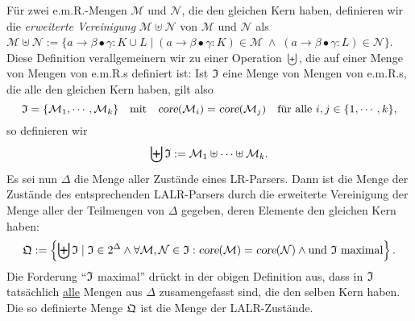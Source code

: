 F\"ur zwei e.m.R.-Mengen $\mathcal{M}$ und $\mathcal{N}$, die
den gleichen Kern haben, definieren wir die \emph{erweiterte Vereinigung}  
$\mathcal{M} \uplus \mathcal{N}$ von $\mathcal{M}$ und $\mathcal{N}$ als
\\[0.2cm]
\hspace*{1.3cm}
$\mathcal{M} \uplus \mathcal{N} := 
   \{ a \rightarrow \beta\bullet \gamma:K \cup L \mid 
      (a \rightarrow \beta\bullet \gamma:K) \in \mathcal{M} \;\wedge\;
      (a \rightarrow \beta\bullet \gamma:L) \in \mathcal{N}
   \}
$.
\\[0.2cm] 
Diese Definition verallgemeinern wir zu einer Operation $\biguplus$, 
die auf einer Menge von Mengen von e.m.R.s definiert ist: Ist $\frak{I}$
eine Menge von Mengen von e.m.R.s, die alle den gleichen Kern haben, gilt also
\[ \frak{I} = \{ \mathcal{M}_1, \cdots, \mathcal{M}_k \} \quad \mbox{mit} \quad
   \textsl{core}(\mathcal{M}_i) = \textsl{core}(\mathcal{M}_j) \quad 
   \mbox{f\"ur alle $i,j\in\{1,\cdots,k\}$,} 
\]
so definieren wir
\[ \biguplus \frak{I} := \mathcal{M}_1 \uplus \cdots \uplus \mathcal{M}_k. 
\]
Es sei nun $\Delta$ die Menge aller Zust\"ande eines LR-Parsers.  Dann ist die Menge der Zust\"ande des
entsprechenden LALR-Parsers durch die erweiterte Vereinigung der Menge aller der Teilmengen 
von $\Delta$ gegeben, deren Elemente den gleichen Kern haben:
\[ \frak{Q} := \left\{ \biguplus \frak{I} \mid \frak{I} \in 2^\Delta \wedge 
      \forall \mathcal{M},\mathcal{N} \in \frak{I}: \textsl{core}(\mathcal{M}) = \textsl{core}(\mathcal{N}) 
      \wedge \mbox{und $\frak{I}$ maximal} 
   \right\}. 
\]
Die Forderung ``$\frak{I}$ maximal'' dr\"uckt in der obigen Definition aus, dass in $\frak{I}$ tats\"achlich
\underline{alle} Mengen aus $\Delta$ zusamengefasst sind, die den selben Kern haben.
Die so definierte Menge $\frak{Q}$ ist die Menge der LALR-Zust\"ande.  


